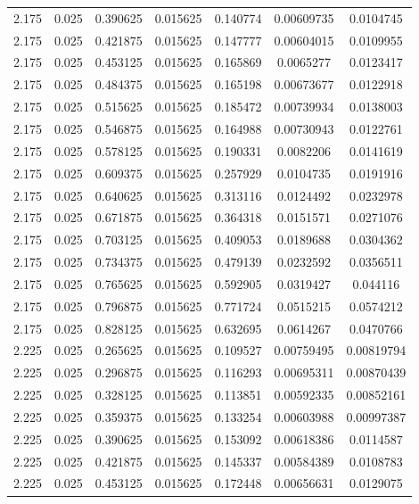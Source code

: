 \begin{table}[bh]
\begin{center}
{\begin{tabular}{ccccccc}
2.175	 & 0.025 & 	0.390625	 & 0.015625	 & 0.140774	 & 0.00609735	 & 0.0104745 \\ 
2.175	 & 0.025 & 	0.421875	 & 0.015625	 & 0.147777	 & 0.00604015	 & 0.0109955 \\ 
2.175	 & 0.025 & 	0.453125	 & 0.015625	 & 0.165869	 & 0.0065277	 & 0.0123417 \\ 
2.175	 & 0.025 & 	0.484375	 & 0.015625	 & 0.165198	 & 0.00673677	 & 0.0122918 \\ 
2.175	 & 0.025 & 	0.515625	 & 0.015625	 & 0.185472	 & 0.00739934	 & 0.0138003 \\ 
2.175	 & 0.025 & 	0.546875	 & 0.015625	 & 0.164988	 & 0.00730943	 & 0.0122761 \\ 
2.175	 & 0.025 & 	0.578125	 & 0.015625	 & 0.190331	 & 0.0082206	 & 0.0141619 \\ 
2.175	 & 0.025 & 	0.609375	 & 0.015625	 & 0.257929	 & 0.0104735	 & 0.0191916 \\ 
2.175	 & 0.025 & 	0.640625	 & 0.015625	 & 0.313116	 & 0.0124492	 & 0.0232978 \\ 
2.175	 & 0.025 & 	0.671875	 & 0.015625	 & 0.364318	 & 0.0151571	 & 0.0271076 \\ 
2.175	 & 0.025 & 	0.703125	 & 0.015625	 & 0.409053	 & 0.0189688	 & 0.0304362 \\ 
2.175	 & 0.025 & 	0.734375	 & 0.015625	 & 0.479139	 & 0.0232592	 & 0.0356511 \\ 
2.175	 & 0.025 & 	0.765625	 & 0.015625	 & 0.592905	 & 0.0319427	 & 0.044116 \\ 
2.175	 & 0.025 & 	0.796875	 & 0.015625	 & 0.771724	 & 0.0515215	 & 0.0574212 \\ 
2.175	 & 0.025 & 	0.828125	 & 0.015625	 & 0.632695	 & 0.0614267	 & 0.0470766 \\ 
2.225	 & 0.025 & 	0.265625	 & 0.015625	 & 0.109527	 & 0.00759495	 & 0.00819794 \\ 
2.225	 & 0.025 & 	0.296875	 & 0.015625	 & 0.116293	 & 0.00695311	 & 0.00870439 \\ 
2.225	 & 0.025 & 	0.328125	 & 0.015625	 & 0.113851	 & 0.00592335	 & 0.00852161 \\ 
2.225	 & 0.025 & 	0.359375	 & 0.015625	 & 0.133254	 & 0.00603988	 & 0.00997387 \\ 
2.225	 & 0.025 & 	0.390625	 & 0.015625	 & 0.153092	 & 0.00618386	 & 0.0114587 \\ 
2.225	 & 0.025 & 	0.421875	 & 0.015625	 & 0.145337	 & 0.00584389	 & 0.0108783 \\ 
2.225	 & 0.025 & 	0.453125	 & 0.015625	 & 0.172448	 & 0.00656631	 & 0.0129075 \\ 

\end{tabular}}
\end{center}
\end{table}
